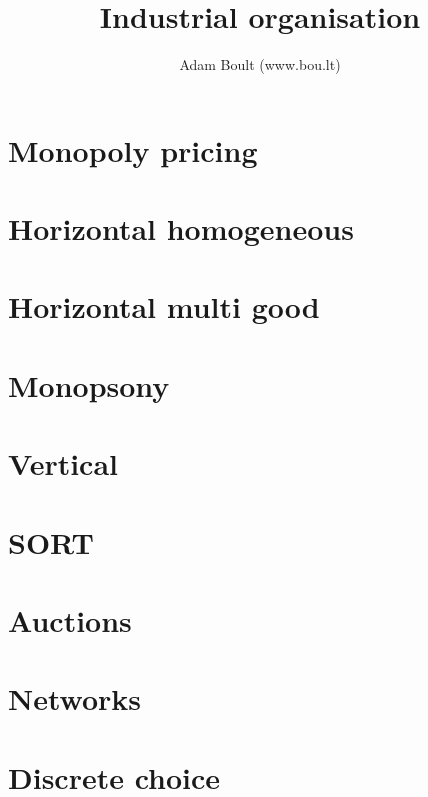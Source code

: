 \documentclass[oneside]{book}
\begin{document}
\author{Adam Boult (www.bou.lt)}
\title{Industrial organisation}
\maketitle

\setcounter{tocdepth}{0}
\tableofcontents



\part{Monopoly pricing}




\part{Horizontal homogeneous}





\part{Horizontal multi good}




\part{Monopsony}

\part{Vertical}


\part{SORT}


\part{Auctions}



\part{Networks}

\part{Discrete choice}



\end{document}
